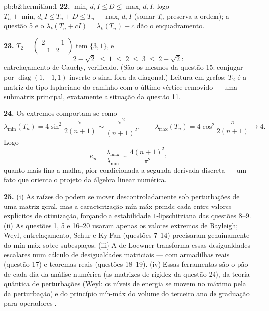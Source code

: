 \begin{solution}{pb:b2:hermitian:1}
\textbf{22.} $\min_id_i\,I \leq D \leq \max_id_i\,I$, logo $T_n +
\min_id_i\,I \leq T_n + D \leq T_n + \max_id_i\,I$
(somar $T_n$ preserva a ordem); a questão 5 e o
$\lambda_k(T_n + cI) = \lambda_k(T_n) + c$ dão o enquadramento.

\textbf{23.} $T_2 = \begin{pmatrix} 2 & -1\\ -1 &
2\end{pmatrix}$ tem  $\{3, 1\}$, e
\[
2 - \sqrt2 \;\leq\; 1 \;\leq\; 2 \;\leq\; 3 \;\leq\; 2 +
\sqrt2 :
\]
entrelaçamento de Cauchy, verificado. (São os mesmos  da
questão 15: conjugar por $\operatorname{diag}(1,-1,1)$ inverte
o sinal fora da diagonal.) Leitura em grafos: $T_2$ é a
matriz do tipo laplaciano do caminho com o último vértice removido
--- uma submatriz principal, exatamente a situação da questão
11.

\textbf{24.} Os  extremos comportam-se como
\[
\lambda_{\min}(T_n) = 4\sin^2\frac{\pi}{2(n+1)}
\sim \frac{\pi^2}{(n+1)^2},
\qquad
\lambda_{\max}(T_n) = 4\cos^2\frac{\pi}{2(n+1)}
\longrightarrow 4 .
\]
Logo
\[
\kappa_n = \frac{\lambda_{\max}}{\lambda_{\min}}
\sim \frac{4(n+1)^2}{\pi^2} :
\]
quanto mais fina a malha, pior condicionada a segunda derivada
discreta --- um fato que orienta o projeto da álgebra linear
numérica.

\textbf{25.} (i) As raízes do  podem
se mover descontroladamente sob perturbações de uma matriz geral, mas a
caracterização mín-máx prende cada   entre
valores explícitos de otimização, forçando a estabilidade
$1$-lipschitziana das questões 8--9. (ii) As questões 1, 5 e 16--20 usaram
apenas os valores extremos de Rayleigh; Weyl, entrelaçamento, Schur e
Ky Fan (questões 7--14) precisaram genuinamente do mín-máx 
sobre subespaços. (iii) A  de Loewner transforma essas desigualdades
escalares num cálculo de desigualdades matriciais --- com
armadilhas reais (questão 17) e teoremas reais (questões 18--19).
(iv) Essas ferramentas são o pão de cada dia da análise numérica
(as matrizes de rigidez da questão 24), da teoria quântica de
perturbações (Weyl: os níveis de energia se movem no máximo pela  da
perturbação) e do princípio mín-máx do volume do terceiro ano de graduação
para operadores  .
\end{solution}
